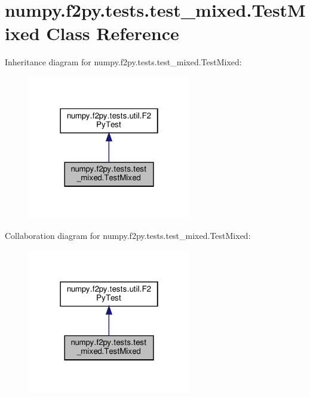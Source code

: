 \hypertarget{classnumpy_1_1f2py_1_1tests_1_1test__mixed_1_1TestMixed}{}\section{numpy.\+f2py.\+tests.\+test\+\_\+mixed.\+Test\+Mixed Class Reference}
\label{classnumpy_1_1f2py_1_1tests_1_1test__mixed_1_1TestMixed}


Inheritance diagram for numpy.\+f2py.\+tests.\+test\+\_\+mixed.\+Test\+Mixed\+:
\nopagebreak
\begin{figure}[H]
\begin{center}
\leavevmode
\includegraphics[width=202pt]{classnumpy_1_1f2py_1_1tests_1_1test__mixed_1_1TestMixed__inherit__graph}
\end{center}
\end{figure}


Collaboration diagram for numpy.\+f2py.\+tests.\+test\+\_\+mixed.\+Test\+Mixed\+:
\nopagebreak
\begin{figure}[H]
\begin{center}
\leavevmode
\includegraphics[width=202pt]{classnumpy_1_1f2py_1_1tests_1_1test__mixed_1_1TestMixed__coll__graph}
\end{center}
\end{figure}
